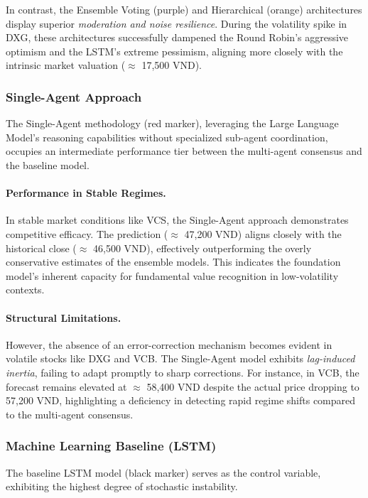 \documentclass{ieeeaccess}
\begin{document}
In contrast, the Ensemble Voting (purple) and Hierarchical (orange) architectures display superior \textit{moderation and noise resilience}. During the volatility spike in DXG, these architectures successfully dampened the Round Robin’s aggressive optimism and the LSTM’s extreme pessimism, aligning more closely with the intrinsic market valuation ($\approx$ 17,500 VND).

\subsubsection{Single-Agent Approach}
The Single-Agent methodology (red marker), leveraging the Large Language Model's reasoning capabilities without specialized sub-agent coordination, occupies an intermediate performance tier between the multi-agent consensus and the baseline model.

\paragraph{Performance in Stable Regimes.}
In stable market conditions like VCS, the Single-Agent approach demonstrates competitive efficacy. The prediction ($\approx$ 47,200 VND) aligns closely with the historical close ($\approx$ 46,500 VND), effectively outperforming the overly conservative estimates of the ensemble models. This indicates the foundation model's inherent capacity for fundamental value recognition in low-volatility contexts.

\paragraph{Structural Limitations.}
However, the absence of an error-correction mechanism becomes evident in volatile stocks like DXG and VCB. The Single-Agent model exhibits \textit{lag-induced inertia}, failing to adapt promptly to sharp corrections. For instance, in VCB, the forecast remains elevated at $\approx$ 58,400 VND despite the actual price dropping to 57,200 VND, highlighting a deficiency in detecting rapid regime shifts compared to the multi-agent consensus.

\subsubsection{Machine Learning Baseline (LSTM)}
The baseline LSTM model (black marker) serves as the control variable, exhibiting the highest degree of stochastic instability.
\end{document}
